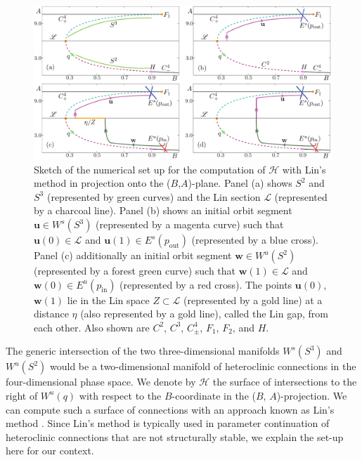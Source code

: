 \documentclass{ws-ijbc}
\begin{document}
\begin{figure}[h]
\centering
\includegraphics[]{./figures/MKMO_8.pdf}
\caption{Sketch of the numerical set up for the computation of $\mathscr{H}$ with Lin's method in projection onto the ($B$,$A$)-plane.  Panel (a) shows $S^2$ and $S^3$ (represented by green curves) and the Lin section $\mathscr{L}$ (represented by a charcoal line).  Panel (b) shows an initial orbit segment $\mathbf{u} \in W^s(S^3)$ (represented by a magenta curve) such that $\mathbf{u}(0) \in \mathscr{L}$ and $\mathbf{u}(1) \in E^s(p_{\text{out}})$ (represented by a blue cross).  Panel (c) additionally an initial orbit segment $\mathbf{w} \in W^u(S^2)$ (represented by a forest green curve) such that $\mathbf{w}(1) \in \mathscr{L}$ and $\mathbf{w}(0) \in E^u(p_{\text{in}})$ (represented by a red cross).  The points $\mathbf{u}(0)$, $\mathbf{w}(1)$ lie in the Lin space $Z \subset \mathscr{L}$ (represented by a gold line) at a distance $\eta$ (also represented by a gold line), called the Lin gap, from each other.  Also shown are $C^2$, $C^3$, $C^4_\pm$, $F_1$, $F_2$, and $H$.}
\label{figure_8}
\end{figure}


The generic intersection of the two three-dimensional manifolds $W^s(S^3)$ and $W^u(S^2)$ would be a two-dimensional manifold of heteroclinic connections in the four-dimensional phase space.  We denote by $\mathscr{H}$ the surface of intersections to the right of $W^u(q)$ with respect to the $B$-coordinate in the ($B$, $A$)-projection.  We can compute such a surface of connections with an approach known as Lin's method \cite{Lin_original, Lin_POs, Lin_POs2}.  Since Lin's method is typically used in parameter continuation of heteroclinic connections that are not structurally stable, we explain the set-up here for our context.  
\end{document}

